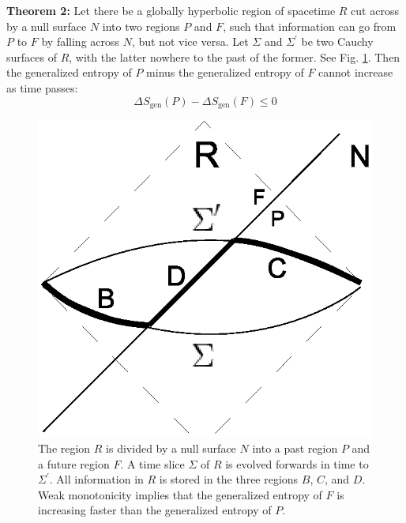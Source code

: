 \documentclass[12pt]{article}
\begin{document}
\textbf{Theorem 2:} Let there be a globally hyperbolic region of spacetime $R$ cut across by a null surface $N$ into two regions $P$ and $F$, such that information can go from $P$ to $F$ by falling across $N$, but not vice versa.  Let $\Sigma$ and $\Sigma^\prime$ be two Cauchy surfaces of $R$, with the latter nowhere to the past of the former.  See Fig. \ref{thm2}.  Then the generalized entropy of $P$ minus the generalized entropy of $F$ cannot increase as time passes:
\begin{equation}\label{PminusF}
\Delta S_\mathrm{gen}(P) - \Delta S_\mathrm{gen}(F) \le 0
\end{equation}
\begin{figure}[ht]
\centering
\includegraphics[width=.5\textwidth]{thm2.eps}
\caption{\small{
The region $R$ is divided by a null surface $N$ into a past region $P$ and a future region $F$.  A time slice $\Sigma$ of $R$ is evolved forwards in time to $\Sigma^\prime$.  All information in $R$ is stored in the three regions $B$, $C$, and $D$.  Weak monotonicity implies that the generalized entropy of $F$ is increasing faster than the generalized entropy of $P$.
}}\label{thm2}
\end{figure}
\end{document}
